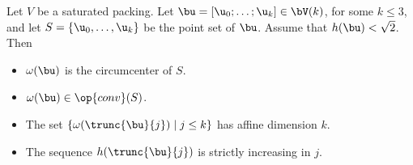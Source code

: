 \begin{lemma}\label{lemma:v2} 
Let $V$ be a saturated packing.
Let $\bu=[\u_0;\ldots;\u_k]\in \bV(k)$, for some $k\le 3$,
and let $S=\{\u_0,\ldots,\u_k\}$ be the
point set of $\bu$.
Assume that $h(\bu)<\sqrt2$.
Then 
\begin{itemize}
\item%
$\omega(\bu)$ is the circumcenter of $S$.
\item%
$\omega(\bu)\in\op{conv}(S)$.
\item%
The set $\{\omega(\trunc{\bu}{j})\mid j\le k\}$ has affine dimension $k$.
\item
The sequence $h(\trunc{\bu}{j})$ is
strictly increasing in $j$.
\end{itemize}
\end{lemma}
%


